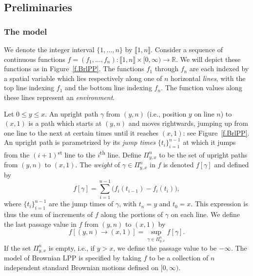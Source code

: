 \documentclass[oneside,final,11pt]{amsart}
\theoremstyle{definition}
\newcommand{\intint}[1]{\llbracket1,#1\rrbracket}
\newcommand{\R}{\mathbb{R}}
\newcommand{\1}[1]{\mathbf{1}_{#1}}
\numberwithin{equation}{section}
\begin{document}



\subsection{Preliminaries}
\subsubsection{The model}
We denote the integer interval $\{1, \ldots, n\}$ by $\intint{n}$. Consider a sequence of continuous functions $f=(f_1, \ldots, f_n) : \intint{n}\times [0,\infty)\to \R$. We will depict these functions as in Figure~\ref{f.BrlPP}. The functions $f_1$ through $f_n$ are each indexed by a spatial variable which lies respectively along one of $n$ horizontal \emph{lines}, with the top line indexing $f_1$ and the bottom line indexing $f_n$. The function values along these lines represent an \emph{environment}.


Let $0\leq y\leq x$. An upright path $\gamma$ from $(y,n)$ (i.e., position $y$ on line $n$) to $(x,1)$ is a path which starts at $(y,n)$ and moves rightwards, jumping up from one line  to the next at certain times until it reaches $(x,1)$: see Figure~\ref{f.BrlPP}. An upright path is parametrized by its \emph{jump times} $\{t_i\}_{i=1}^{n-1}$ at which it jumps from the $(i+1)$\textsuperscript{st} line to the $i$\textsuperscript{th} line. Define $\Pi^n_{y,x}$ to be the set of upright paths from $(y,n)$ to $(x,1)$. The \emph{weight} of $\gamma \in \Pi^n_{y,x}$ in $f$ is denoted $f[\gamma]$ and defined by
%
\begin{equation}\label{e.path weight definition}
f[\gamma] = \sum_{i=1}^{n-1} \Big(f_i(t_{i-1}) - f_i(t_{i})\Big),
\end{equation}
%
where $\{t_i\}_{i=1}^{n-1}$ are the jump times of $\gamma$, with $t_n=y$ and $t_0=x$. This expression is thus the sum of increments of $f$ along the portions of $\gamma$ on each line.
%
We define the last passage value in $f$ from $(y,n)$ to $(x,1)$ by
%
\begin{equation}\label{e.lpp definition}
f[(y,n)\to (x,1)] = \sup_{\gamma\in \Pi^n_{y,x}} f[\gamma].
\end{equation}
%
If the set $\Pi^n_{y,x}$ is empty, i.e., if $y>x$, we define the passage value to be $-\infty$. The model of Brownian LPP is specified by taking $f$ to be a collection of $n$ independent standard Brownian motions defined on $[0, \infty)$.
\end{document}
